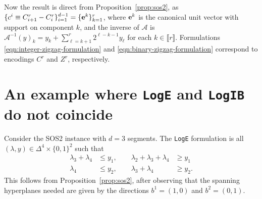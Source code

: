 \documentclass[opre,nonblindrev]{informs3} %
\newcommand{\scrA}{\mathscr{A}}
\newcommand{\bbZ}{\mathbb{Z}}
\newcommand{\calC}{\mathcal{C}}
\newcommand{\calZ}{\mathcal{Z}}
\newcommand{\Conv}{\operatorname{Conv}}
\newcommand{\Log}{\texttt{LogE}}
\newcommand{\LogIB}{\texttt{LogIB}}
\begin{document}
\begin{APPENDICES}

        Now the result is direct from Proposition~\ref{prop:sos2}, as $\{c^i \equiv C^r_{i+1}-C^r_i\}_{i=1}^{d-1} = \{{\bf e}^k\}_{k=1}^r$, where ${\bf e}^k$ is the canonical unit vector with support on component $k$, and the inverse of $\scrA$ is $\scrA^{-1}(y)_k = y_k + \sum_{\ell=k+1}^r 2^{\ell-k-1}y_\ell$ for each $k \in \llbracket r \rrbracket$. Formulations \eqref{eqn:integer-zigzag-formulation} and \eqref{eqn:binary-zigzag-formulation} correspond to encodings $C^r$ and $Z^r$, respectively.
    \Halmos\endproof
    
\section{An example where \Log{} and \LogIB{} do not coincide} \label{app:log-logib}

Consider the SOS2 instance with $d=3$ segments. The \Log{} formulation is all $(\lambda,y) \in \Delta^4 \times \{0,1\}^2$ such that
\begin{subequations}\label{eqn:log-non-power-of-two-example}
\begin{alignat}{2}
    \lambda_3 + \lambda_4 &\leq y_1, \quad\quad \lambda_2 + \lambda_3 + \lambda_4 &\geq y_1 \label{eqn:log-non-power-of-two-example-1} \\
    \lambda_4 &\leq y_2, \quad\quad \lambda_3 + \lambda_4 &\geq y_2.
\end{alignat}
\end{subequations}
This follows from Proposition~\ref{prop:sos2}, after observing that the spanning hyperplanes needed are given by the directions $b^1=(1,0)$ and $b^2=(0,1)$.


\end{APPENDICES}
\end{document}
